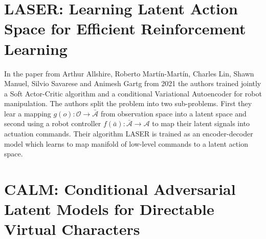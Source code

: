 \section{LASER: Learning Latent Action Space for Efficient Reinforcement Learning}

In the paper from Arthur Allshire, Roberto Martín-Martín, Charles Lin, Shawn Manuel, Silvio Savarese and Animesh Gartg from 2021 \cite{LASER} the authors trained jointly a Soft Actor-Critic algorithm and a conditional Variational Autoencoder for robot manipulation. The authors split the problem into two sub-problems. First they lear a mapping $g(o): \mathcal{O} \to \bar{\mathcal{A}}$ from observation space into a latent space and second using a robot controller $f(\bar{a}): \bar{\mathcal{A}} \to \mathcal{A}$ to map their latent signals into actuation commands. Their algorithm LASER is trained as an encoder-decoder model which learns to map manifold of low-level commands to a latent action space. 

% 


\section{CALM: Conditional Adversarial Latent Models for Directable Virtual Characters}

